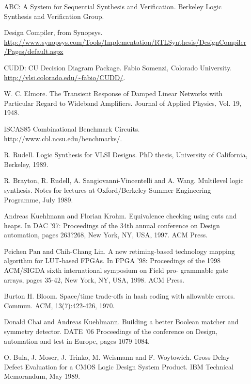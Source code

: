 \documentclass{fmetfm}
\begin{document}
\begin{thebibliography}{9}

ABC: A System for Sequential Synthesis and Verification. Berkeley Logic Synthesis and Verification Group.
 
Design Compiler, from Synopsys. \url{http://www.synopsys.com/Tools/Implementation/RTLSynthesis/DesignCompiler/Pages/default.aspx}

CUDD: CU Decision Diagram Package. Fabio Somenzi, Colorado University. \url{http://vlsi.colorado.edu/~fabio/CUDD/}.

W. C. Elmore. The Transient Response of Damped Linear Networks with Particular Regard to Wideband Amplifiers. Journal of Applied Physics, Vol. 19, 1948.

ISCAS85 Combinational Benchmark Circuits. \url{http://www.cbl.ncsu.edu/benchmarks/}.

R. Rudell. Logic Synthesis for VLSI Designs. PhD thesis, University of California, Berkeley, 1989.

R. Brayton, R. Rudell, A. Sangiovanni-Vincentelli and A. Wang. Multilevel logic synthesis. Notes for lectures at Oxford/Berkeley Summer Engineering Programme, July 1989.

Andreas Kuehlmann and Florian Krohm. Equivalence checking using
cuts and heaps. In DAC '97: Proceedings of the 34th annual conference
 on Design automation, pages 263?268, New York, NY, USA, 1997. ACM
  Press.

Peichen Pan and Chih-Chang Lin. A new retiming-based technology
mapping algorithm for LUT-based FPGAs. In FPGA '98: Proceedings
 of the 1998 ACM/SIGDA sixth international symposium on Field pro-
grammable gate arrays, pages 35-42, New York, NY, USA, 1998. ACM
 Press.
 
Burton H. Bloom. Space/time trade-offs in hash coding with allowable
errors. Commun. ACM, 13(7):422-426, 1970.

Donald Chai and Andreas Kuehlmann. Building a better Boolean matcher and symmetry detector. DATE '06 Proceedings of the conference on Design, automation and test in Europe, pages 1079-1084. 

O. Bula, J. Moser, J. Trinko, M. Weismann and F. Woytowich. Gross Delay Defect Evaluation for a CMOS Logic Design System Product. IBM Technical Memorandum, May 1989.


\end{thebibliography}
\end{document}
